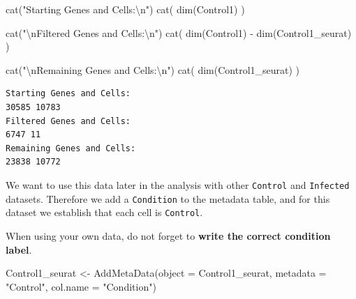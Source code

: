 \documentclass[
  letterpaper,
  DIV=11,
  numbers=noendperiod]{scrartcl}
\newenvironment{Shaded}{}{}
\newcommand{\AttributeTok}[1]{\textcolor[rgb]{0.49,0.56,0.16}{#1}}
\newcommand{\FunctionTok}[1]{\textcolor[rgb]{0.02,0.16,0.49}{#1}}
\newcommand{\NormalTok}[1]{#1}
\newcommand{\OtherTok}[1]{\textcolor[rgb]{0.00,0.44,0.13}{#1}}
\newcommand{\SpecialCharTok}[1]{\textcolor[rgb]{0.25,0.44,0.63}{#1}}
\newcommand{\StringTok}[1]{\textcolor[rgb]{0.25,0.44,0.63}{#1}}
\begin{document}
\begin{Shaded}
\begin{Highlighting}[]
\FunctionTok{cat}\NormalTok{(}\StringTok{"Starting Genes and Cells:}\SpecialCharTok{\textbackslash{}n}\StringTok{"}\NormalTok{)}
\FunctionTok{cat}\NormalTok{( }\FunctionTok{dim}\NormalTok{(Control1) )}

\FunctionTok{cat}\NormalTok{(}\StringTok{"}\SpecialCharTok{\textbackslash{}n}\StringTok{Filtered Genes and Cells:}\SpecialCharTok{\textbackslash{}n}\StringTok{"}\NormalTok{)}
\FunctionTok{cat}\NormalTok{( }\FunctionTok{dim}\NormalTok{(Control1) }\SpecialCharTok{{-}} \FunctionTok{dim}\NormalTok{(Control1\_seurat) )}

\FunctionTok{cat}\NormalTok{(}\StringTok{"}\SpecialCharTok{\textbackslash{}n}\StringTok{Remaining Genes and Cells:}\SpecialCharTok{\textbackslash{}n}\StringTok{"}\NormalTok{)}
\FunctionTok{cat}\NormalTok{( }\FunctionTok{dim}\NormalTok{(Control1\_seurat) )}
\end{Highlighting}
\end{Shaded}

\begin{verbatim}
Starting Genes and Cells:
30585 10783
Filtered Genes and Cells:
6747 11
Remaining Genes and Cells:
23838 10772
\end{verbatim}

We want to use this data later in the analysis with other
\texttt{Control} and \texttt{Infected} datasets. Therefore we add a
\texttt{Condition} to the metadata table, and for this dataset we
establish that each cell is \texttt{Control}.

\begin{tcolorbox}[enhanced jigsaw, arc=.35mm, opacityback=0, coltitle=black, toprule=.15mm, opacitybacktitle=0.6, titlerule=0mm, colbacktitle=quarto-callout-important-color!10!white, left=2mm, breakable, bottomtitle=1mm, title=\textcolor{quarto-callout-important-color}{\faExclamation}\hspace{0.5em}{Important}, toptitle=1mm, colframe=quarto-callout-important-color-frame, leftrule=.75mm, rightrule=.15mm, bottomrule=.15mm, colback=white]

When using your own data, do not forget to \textbf{write the correct
condition label}.

\end{tcolorbox}

\begin{Shaded}
\begin{Highlighting}[]
\NormalTok{Control1\_seurat }\OtherTok{\textless{}{-}} \FunctionTok{AddMetaData}\NormalTok{(}\AttributeTok{object =}\NormalTok{ Control1\_seurat, }
                                        \AttributeTok{metadata =} \StringTok{"Control"}\NormalTok{, }
                                        \AttributeTok{col.name =} \StringTok{"Condition"}\NormalTok{)}
\end{Highlighting}
\end{Shaded}
\end{document}
